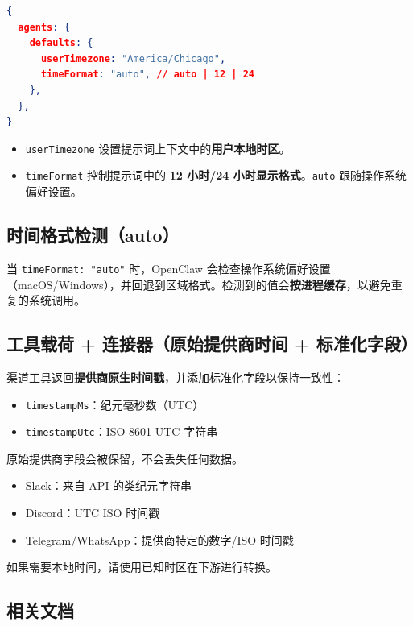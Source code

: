 \begin{lstlisting}[language=json]
{
  agents: {
    defaults: {
      userTimezone: "America/Chicago",
      timeFormat: "auto", // auto | 12 | 24
    },
  },
}
\end{lstlisting}


\begin{itemize}
  \item \texttt{userTimezone} 设置提示词上下文中的\textbf{用户本地时区}。
  \item \texttt{timeFormat} 控制提示词中的 \textbf{12 小时/24 小时显示格式}。\texttt{auto} 跟随操作系统偏好设置。
\end{itemize}


\subsection{时间格式检测（auto）}


当 \texttt{timeFormat: "auto"} 时，OpenClaw 会检查操作系统偏好设置（macOS/Windows），并回退到区域格式。检测到的值会\textbf{按进程缓存}，以避免重复的系统调用。

\subsection{工具载荷 + 连接器（原始提供商时间 + 标准化字段）}


渠道工具返回\textbf{提供商原生时间戳}，并添加标准化字段以保持一致性：

\begin{itemize}
  \item \texttt{timestampMs}：纪元毫秒数（UTC）
  \item \texttt{timestampUtc}：ISO 8601 UTC 字符串
\end{itemize}


原始提供商字段会被保留，不会丢失任何数据。

\begin{itemize}
  \item Slack：来自 API 的类纪元字符串
  \item Discord：UTC ISO 时间戳
  \item Telegram/WhatsApp：提供商特定的数字/ISO 时间戳
\end{itemize}


如果需要本地时间，请使用已知时区在下游进行转换。

\subsection{相关文档}


